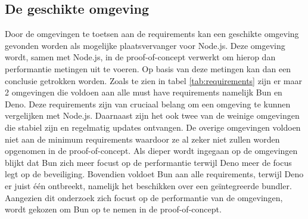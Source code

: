 \subsection{De geschikte omgeving}
Door de omgevingen te toetsen aan de requirements kan een geschikte 
omgeving gevonden worden als mogelijke plaatsvervanger voor Node.js.
Deze omgeving wordt, samen met Node.js, in de proof-of-concept verwerkt om hierop dan performantie metingen uit te voeren.
Op basis van deze metingen kan dan een conclusie getrokken worden.
Zoals te zien in tabel \ref{tab:requirements} zijn er maar 2 omgevingen die voldoen aan alle must have requirements namelijk Bun en Deno. 
Deze requirements zijn van cruciaal belang om een omgeving te kunnen vergelijken met Node.js. 
Daarnaast zijn het ook twee van de weinige omgevingen die stabiel zijn en regelmatig updates ontvangen. 
De overige omgevingen voldoen niet aan de minimum requirements waardoor ze al zeker niet zullen worden opgenomen in de proof-of-concept.
Als dieper wordt ingegaan op de omgevingen blijkt dat Bun zich meer focust op de performantie terwijl Deno meer de focus legt op de beveiliging.
Bovendien voldoet Bun aan alle requirements, terwijl Deno er juist één ontbreekt, namelijk het beschikken over een geïntegreerde bundler. 
Aangezien dit onderzoek zich focust op de performantie van de omgevingen, wordt gekozen om Bun op te nemen in de proof-of-concept.